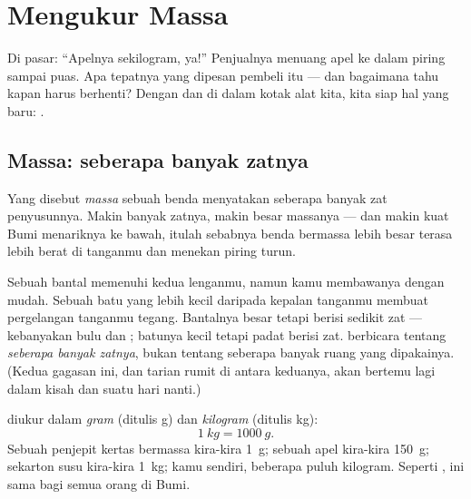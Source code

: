 \chapter{Mengukur Massa}\label{ch:g3:measuring-mass}

Di pasar: ``Apelnya sekilogram, ya!'' Penjualnya menuang apel ke dalam
piring  sampai  puas. Apa tepatnya yang dipesan pembeli
itu --- dan bagaimana  tahu kapan harus berhenti? Dengan 
dan  di dalam kotak alat kita, kita siap  hal yang baru:
.

\section{Massa: seberapa banyak zatnya}

\begin{definition}[Massa]\label{def:g3:measuring-mass:mass}
Yang disebut \emph{massa} sebuah benda menyatakan
seberapa banyak zat penyusunnya. Makin banyak zatnya, makin besar
massanya --- dan makin kuat Bumi menariknya ke bawah, itulah sebabnya
benda bermassa lebih besar terasa lebih berat di tanganmu dan menekan
piring  turun.
\end{definition}

\begin{example}\label{ex:g3:measuring-mass:bignotcheavy}
Sebuah bantal memenuhi kedua lenganmu, namun kamu membawanya dengan
mudah. Sebuah batu yang lebih kecil daripada kepalan tanganmu membuat
pergelangan tanganmu tegang. Bantalnya besar tetapi berisi sedikit zat
--- kebanyakan bulu dan ; batunya kecil tetapi padat berisi zat.
 berbicara tentang \emph{seberapa banyak zatnya}, bukan tentang
seberapa banyak ruang yang dipakainya. (Kedua gagasan ini, dan tarian
rumit di antara keduanya, akan bertemu lagi dalam kisah  dan
 suatu hari nanti.)
\end{example}

\begin{definition}\label{def:g3:measuring-mass:units}
 diukur dalam \emph{gram} (ditulis \unit{g}) dan
\emph{kilogram} (ditulis \unit{kg}):
\[
\qty{1}{kg} = \qty{1000}{g}.
\]
Sebuah penjepit kertas bermassa kira-kira \qty{1}{g}; sebuah apel
kira-kira \qty{150}{g}; sekarton susu kira-kira \qty{1}{kg}; kamu
sendiri, beberapa puluh kilogram. Seperti ,  ini sama bagi
semua orang di Bumi.
\end{definition}

